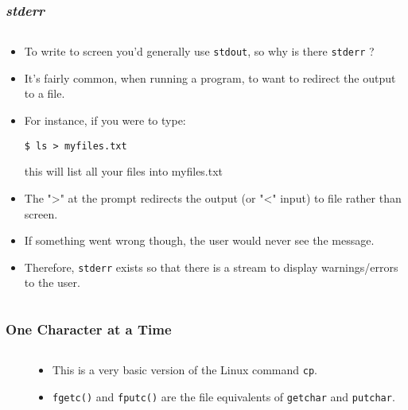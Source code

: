
\begin{frame}[fragile]
\frametitle{{\em stderr}}
\begin{columns}[T]

\begin{column}{0.90\textwidth}
\begin{itemize}[<+->]
\item To write to screen you'd generally use \verb^stdout^, so why is there \verb^stderr^ ?
\item It's fairly common, when running a program, to want to redirect the output to a file.
\item For instance, if you were to type:
\begin{verbatim}
$ ls > myfiles.txt
\end{verbatim}
this will list all your files into myfiles.txt
\item The ">" at the prompt redirects the output (or "<" input) to file rather than screen.
\item If something went wrong though, the user would never see the message.
\item Therefore, \verb^stderr^ exists so that there is a stream to display warnings/errors to the user.
\end{itemize}
\end{column}

\end{columns}
\end{frame}


\begin{frame}[fragile]
\frametitle{One Character at a Time}
\begin{columns}[T]

\begin{column}{0.50\textwidth}

\end{column}

\pause
\begin{column}{0.40\textwidth}
\begin{itemize}[<+->]
\item This is a very basic version of the Linux command \verb^cp^.
\item \verb^fgetc()^ and \verb^fputc()^ are the file equivalents of \verb^getchar^ and \verb^putchar^.
\end{itemize}
\end{column}


\end{columns}
\end{frame}


